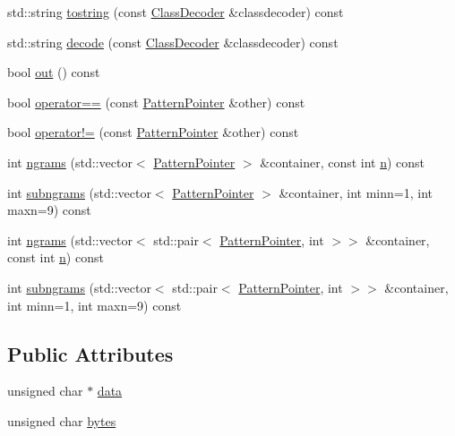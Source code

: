 \begin{DoxyCompactItemize}
\item 
std\+::string \hyperlink{classPatternPointer_ab17b7641c0651d2879bfe320826492e7}{tostring} (const \hyperlink{classClassDecoder}{Class\+Decoder} \&classdecoder) const 
\item 
std\+::string \hyperlink{classPatternPointer_ac35cb0151096929cd0054f77110e1afe}{decode} (const \hyperlink{classClassDecoder}{Class\+Decoder} \&classdecoder) const 
\item 
bool \hyperlink{classPatternPointer_a281b6877995271a87cf561c450c4421b}{out} () const 
\item 
bool \hyperlink{classPatternPointer_a70e5e8f505fe4b136f37ab6e19ffc1c7}{operator==} (const \hyperlink{classPatternPointer}{Pattern\+Pointer} \&other) const 
\item 
bool \hyperlink{classPatternPointer_acdb6d4e30680813986d6e6d2cc4c49c3}{operator!=} (const \hyperlink{classPatternPointer}{Pattern\+Pointer} \&other) const 
\item 
int \hyperlink{classPatternPointer_aafda149990a0f254f2c24d121796df55}{ngrams} (std\+::vector$<$ \hyperlink{classPatternPointer}{Pattern\+Pointer} $>$ \&container, const int \hyperlink{classPatternPointer_a557d9f27ecad057a8942770313c22e42}{n}) const 
\item 
int \hyperlink{classPatternPointer_a86f864d3b5d9504f8aa29836a4c57049}{subngrams} (std\+::vector$<$ \hyperlink{classPatternPointer}{Pattern\+Pointer} $>$ \&container, int minn=1, int maxn=9) const 
\item 
int \hyperlink{classPatternPointer_a68524816c4b4504aa950a6000d5fbd15}{ngrams} (std\+::vector$<$ std\+::pair$<$ \hyperlink{classPatternPointer}{Pattern\+Pointer}, int $>$$>$ \&container, const int \hyperlink{classPatternPointer_a557d9f27ecad057a8942770313c22e42}{n}) const 
\item 
int \hyperlink{classPatternPointer_a9313e5d4ec8575aab14f04922011ed71}{subngrams} (std\+::vector$<$ std\+::pair$<$ \hyperlink{classPatternPointer}{Pattern\+Pointer}, int $>$$>$ \&container, int minn=1, int maxn=9) const 
\end{DoxyCompactItemize}
\subsection*{Public Attributes}
\begin{DoxyCompactItemize}
\item 
unsigned char $\ast$ \hyperlink{classPatternPointer_ad754ecbbeeb29fbebb075f520884e11d}{data}
\item 
unsigned char \hyperlink{classPatternPointer_a2fe42598c138a68c059f4207ef2ead64}{bytes}
\end{DoxyCompactItemize}


